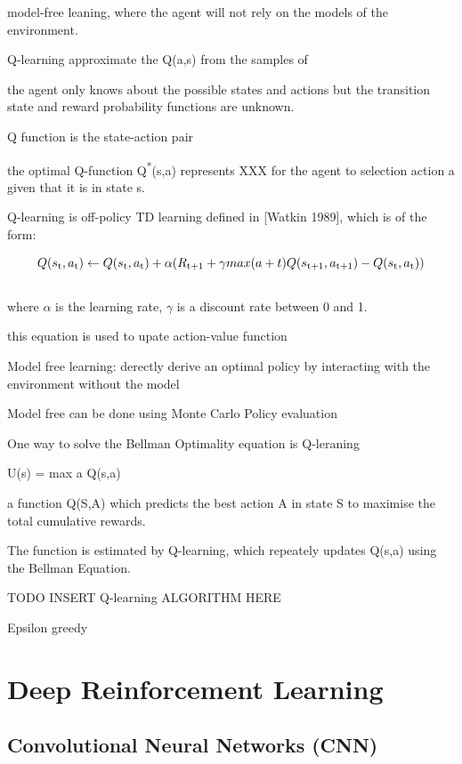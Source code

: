 \documentclass[12pt,twoside]{report}
\begin{document}
model-free leaning, where the agent will not rely on the models of the environment.

Q-learning approximate the Q(a,s) from the samples of

the agent only knows about the possible states and actions but the transition state and reward probability functions are unknown.

Q function is the state-action pair

the optimal Q-function Q\textsuperscript{*}(s,a) represents XXX for the agent to selection action a given that it is in state s.

Q-learning is off-policy TD learning defined in [Watkin 1989], which is of the form:

\begin{equation}
Q(s\textsubscript{t},a\textsubscript{t}) \leftarrow Q(s\textsubscript{t},a\textsubscript{t}) + \alpha(R\textsubscript{t+1} + \gamma max (a+t) Q(s\textsubscript{t+1}, a\textsubscript{t+1}) - Q(s\textsubscript{t}, a\textsubscript{t}))

\end{equation}
\\
where $\alpha$ is the learning rate, $\gamma$ is a discount rate between 0 and 1.

this equation is used to upate action-value function

Model free learning: derectly derive an optimal policy by interacting with the environment without the model

Model free can be done using Monte Carlo Policy evaluation

One way to solve the Bellman Optimality equation is Q-leraning

U(s) = max a Q(s,a)


a function Q(S,A) which predicts the best action A in state S to maximise the total cumulative rewards.

The function is estimated by Q-learning, which repeately updates Q(s,a) using
the Bellman Equation.

TODO INSERT Q-learning ALGORITHM HERE


Epsilon greedy

\section{Deep Reinforcement Learning}
\label{drl}

\subsection{Convolutional Neural Networks (CNN)}
\label{cnn}
\end{document}
